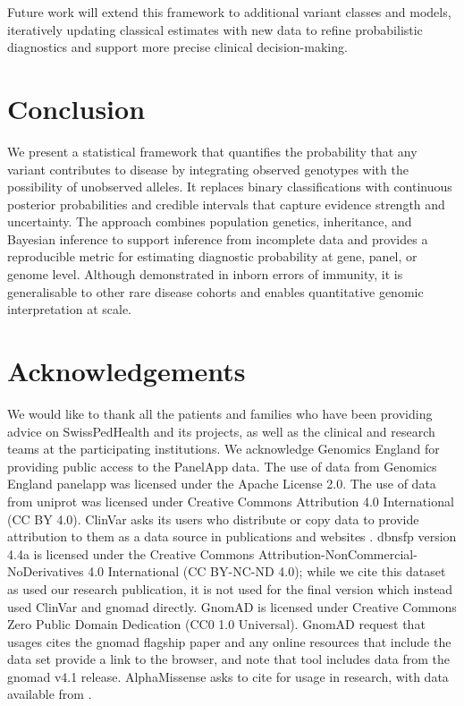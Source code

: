 Future work will extend this framework to additional variant classes and models, iteratively updating classical estimates with new data to refine probabilistic diagnostics and support more precise clinical decision-making.

\section{Conclusion}
We present a statistical framework that quantifies the probability that any variant contributes to disease by integrating observed genotypes with the possibility of unobserved alleles. It replaces binary classifications with continuous posterior probabilities and credible intervals that capture evidence strength and uncertainty. The approach combines population genetics, inheritance, and Bayesian inference to support inference from incomplete data and provides a reproducible metric for estimating diagnostic probability at gene, panel, or genome level. Although demonstrated in inborn errors of immunity, it is generalisable to other rare disease cohorts and enables quantitative genomic interpretation at scale.

\section*{Acknowledgements}
\noindent
We would like to thank all the patients and families who have been providing advice on SwissPedHealth and its projects, as well as the clinical and research teams at the participating institutions.
We acknowledge Genomics England for providing public access to the PanelApp data.
The use of data from Genomics England panelapp was licensed under the Apache License 2.0.
The use of data from \ac{uniprot} was licensed under Creative Commons Attribution 4.0 International (CC BY 4.0).
ClinVar asks its users who distribute or copy data to provide attribution to them as a data source in publications and websites \cite{landrum_clinvar_2018}.
\ac{dbnsfp} version 4.4a is licensed under the Creative Commons Attribution-NonCommercial-NoDerivatives 4.0 International (CC BY-NC-ND 4.0); while we cite this dataset as used our research publication, it is not used for the final version which instead used ClinVar and \ac{gnomad} directly.
GnomAD is licensed under  Creative Commons  Zero Public Domain Dedication (CC0 1.0 Universal).
GnomAD request that usages cites the \ac{gnomad} flagship paper \cite{karczewski2020mutational}
and any online resources that include the data set provide a link to the browser, and note that tool includes data from the \ac{gnomad} v4.1 release.
AlphaMissense asks to cite \citet{cheng_accurate_2023} for usage in research, with data available from \citet{jun_cheng_2023_8208688}.


